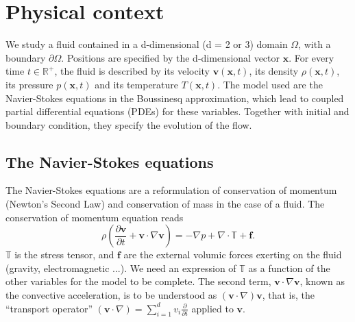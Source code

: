 \documentclass[12pt]{article}
\newcommand{\R}{\mathbb{R}}
\newcommand{\vb}[1]{\ensuremath{\boldsymbol #1}}
\begin{document}









\section{Physical context}
We study a fluid contained in a d-dimensional (d = 2 or 3) domain
$\Omega$, with a boundary $\partial \Omega$. Positions are specified
by the d-dimensional vector \vb{x}. For every time $t \in \R^+$, the
fluid is described by its velocity $\vb{v}(\vb{x}, t)$, its density
$\rho(\vb{x}, t)$, its pressure $p(\vb{x},t)$ and its temperature
$T(\vb{x}, t)$. The model used are the Navier-Stokes equations in the
Boussinesq approximation, which lead to coupled partial differential
equations (PDEs) for these variables. Together with initial and
boundary condition, they specify the evolution of the flow.
\subsection{The Navier-Stokes equations}
The Navier-Stokes equations are a reformulation of conservation of
momentum (Newton's Second Law) and conservation of mass in the case of
a fluid. The conservation of momentum equation reads
\begin{equation}
  \label{ns-mom}
  \rho \left(\frac{\partial \vb{v}}{\partial t} + \vb{v} \cdot
    \nabla \vb{v}\right) = -\nabla p + \nabla \cdot\mathbb{T} +
  \vb{f}.
\end{equation}
$\mathbb{T}$ is the stress tensor, and \vb{f} are the external volumic
forces exerting on the fluid (gravity, electromagnetic ...).  We need
an expression of $\mathbb{T}$ as a function of the other variables for
the model to be complete. The second term, $\vb{v} \cdot \nabla
\vb{v}$, known as the convective acceleration, is to be understood
as $(\vb{v} \cdot \nabla) \vb{v}$, that is, the ``transport operator''
$(\vb{v} \cdot \nabla) = \sum_{i=1}^d v_i \frac{\partial}{\partial i}$
applied to $\vb{v}$.
\end{document}
